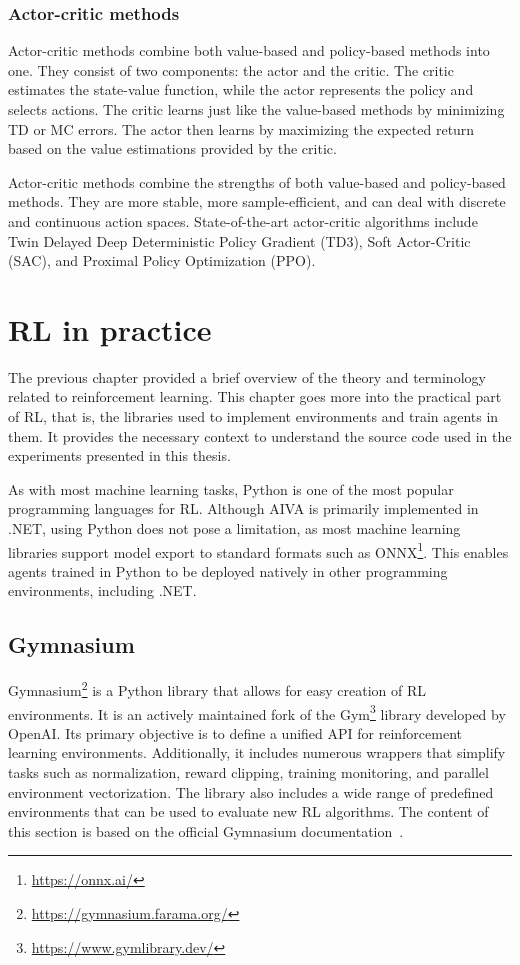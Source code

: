 \documentclass[
  digital,     %
  oneside,     %
  nosansbold,  %
  nocolorbold, %
  lof,         %
  lot,         %
]{fithesis4}
\begin{document}
\subsection{Actor-critic methods}

Actor-critic methods combine both value-based and policy-based methods into one. They consist of two components: the actor and the critic. The critic estimates the state-value function, while the actor represents the policy and selects actions. The critic learns just like the value-based methods by minimizing TD or MC errors. The actor then learns by maximizing the expected return based on the value estimations provided by the critic.

Actor-critic methods combine the strengths of both value-based and policy-based methods. They are more stable, more sample-efficient, and can deal with discrete and continuous action spaces. State-of-the-art actor-critic algorithms include Twin Delayed Deep Deterministic Policy Gradient (TD3), Soft Actor-Critic (SAC), and Proximal Policy Optimization (PPO).

\chapter{RL in practice}

The previous chapter provided a brief overview of the theory and terminology related to reinforcement learning. This chapter goes more into the practical part of RL, that is, the libraries used to implement environments and train agents in them. It provides the necessary context to understand the source code used in the experiments presented in this thesis.

As with most machine learning tasks, Python is one of the most popular programming languages for RL. Although AIVA is primarily implemented in .NET, using Python does not pose a limitation, as most machine learning libraries support model export to standard formats such as ONNX\footnote{\url{https://onnx.ai/}}. This enables agents trained in Python to be deployed natively in other programming environments, including .NET.

\section{Gymnasium}
\label{sec:gym}
Gymnasium\footnote{\url{https://gymnasium.farama.org/}} is a Python library that allows for easy creation of RL environments. It is an actively maintained fork of the Gym\footnote{\url{https://www.gymlibrary.dev/}} library developed by OpenAI. Its primary objective is to define a unified API for reinforcement learning environments. Additionally, it includes numerous wrappers that simplify tasks such as normalization, reward clipping, training monitoring, and parallel environment vectorization. The library also includes a wide range of predefined environments that can be used to evaluate new RL algorithms. The content of this section is based on the official Gymnasium documentation~\cite{gym-docs}.
\end{document}

